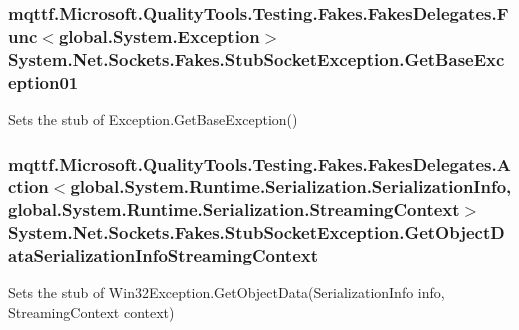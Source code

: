 \hypertarget{class_system_1_1_net_1_1_sockets_1_1_fakes_1_1_stub_socket_exception_a7f18144ec07a48242a6e7bf50930b27c}{
\subsubsection[{Get\-Base\-Exception01}]{\setlength{\rightskip}{0pt plus 5cm}mqttf.\-Microsoft.\-Quality\-Tools.\-Testing.\-Fakes.\-Fakes\-Delegates.\-Func$<$global.\-System.\-Exception$>$ System.\-Net.\-Sockets.\-Fakes.\-Stub\-Socket\-Exception.\-Get\-Base\-Exception01}}\label{class_system_1_1_net_1_1_sockets_1_1_fakes_1_1_stub_socket_exception_a7f18144ec07a48242a6e7bf50930b27c}


Sets the stub of Exception.\-Get\-Base\-Exception()

\hypertarget{class_system_1_1_net_1_1_sockets_1_1_fakes_1_1_stub_socket_exception_a26fdb57d549b10d890cd542fe38a23de}{
\subsubsection[{Get\-Object\-Data\-Serialization\-Info\-Streaming\-Context}]{\setlength{\rightskip}{0pt plus 5cm}mqttf.\-Microsoft.\-Quality\-Tools.\-Testing.\-Fakes.\-Fakes\-Delegates.\-Action$<$global.\-System.\-Runtime.\-Serialization.\-Serialization\-Info, global.\-System.\-Runtime.\-Serialization.\-Streaming\-Context$>$ System.\-Net.\-Sockets.\-Fakes.\-Stub\-Socket\-Exception.\-Get\-Object\-Data\-Serialization\-Info\-Streaming\-Context}}\label{class_system_1_1_net_1_1_sockets_1_1_fakes_1_1_stub_socket_exception_a26fdb57d549b10d890cd542fe38a23de}


Sets the stub of Win32\-Exception.\-Get\-Object\-Data(\-Serialization\-Info info, Streaming\-Context context)

